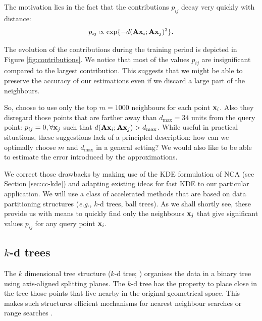 The motivation lies in the fact that the contributions $p_{ij}$ decay very
quickly with distance:
 \[
 	p_{ij} \propto \exp\{-d(\mathbf{A}\mathbf{x}_i;\mathbf{A}\mathbf{x}_j)^2\}.
 \] 
 
 The evolution of the contributions during the training period is depicted in
Figure \ref{fig:contributions}.  We notice that most of the values $p_{ij}$ are insignificant compared
to the largest contribution. This suggests that we might be able to preserve the
accuracy of our estimations even if we discard a large part of the neighbours.

So, \citet{weinberger2007} choose to use only the top $m = 1000$ neighbours for
each point $\mathbf{x}_i$. Also they disregard those points that are farther away than
$d_{\max}=34$ units from the query point: $p_{ij} = 0, \forall \mathbf{x}_j$ such that
$d(\mathbf{A}\mathbf{x}_i;\mathbf{A}\mathbf{x}_j)>d_{\max}$. While useful in practical situations, these
suggestions lack of a principled description: how can we optimally choose $m$
and $d_{\max}$ in a general setting? We would also like to be able to estimate
the error introduced by the approximations.

We correct those drawbacks by making use of the KDE formulation of NCA (see
Section \ref{sec:cc-kde}) and adapting existing ideas for fast KDE
\citep{deng1995,gray2003} to our particular application. We will use a class of
accelerated methods that are based on data partitioning structures
(\textit{e.g.}, $k$-d trees, ball trees). As we shall shortly see, these provide
us with means to quickly find only the neighbours $\mathbf{x}_j$ that give significant
values $p_{ij}$ for any query point $\mathbf{x}_i$. 
%

\subsection{$k$-d trees}
\label{subsec:k-d-trees}

The $k$ dimensional tree structure ($k$-d tree; \citealp{bentley1975}) organises
the data in a binary tree using axis-aligned splitting planes. The $k$-d tree
has the property to place close in the tree those points that live nearby in the
original geometrical space. This makes such structures efficient mechanisms for
nearest neighbour searches \citep{friedman1977} or range searches
\citep{moore1991}.

